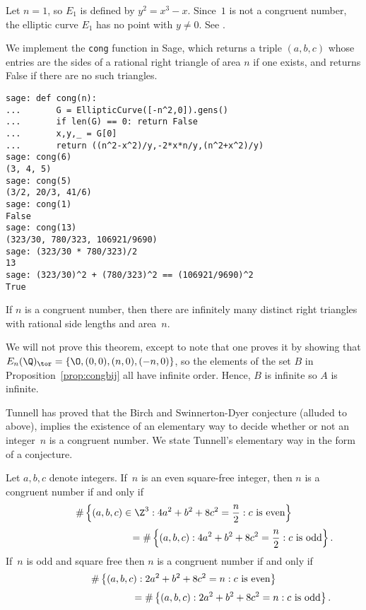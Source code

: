 \begin{example}
Let $n=1$, so $E_1$ is defined by $y^2=x^3-x$.  Since~$1$ is not
a congruent number, the elliptic curve $E_1$ has no point
with $y\neq 0$.  See .
\end{example}

\begin{sg}
  We implement the {\tt cong} function in Sage, which returns a triple
  $(a,b,c)$ whose entries are the sides of a rational right triangle
  of area $n$ if one exists, and returns False if there are no such
  triangles.
\begin{verbatim}
sage: def cong(n):
...       G = EllipticCurve([-n^2,0]).gens()
...       if len(G) == 0: return False
...       x,y,_ = G[0]
...       return ((n^2-x^2)/y,-2*x*n/y,(n^2+x^2)/y)
sage: cong(6)
(3, 4, 5)
sage: cong(5)
(3/2, 20/3, 41/6)
sage: cong(1)
False
sage: cong(13)
(323/30, 780/323, 106921/9690)
sage: (323/30 * 780/323)/2
13
sage: (323/30)^2 + (780/323)^2 == (106921/9690)^2
True
\end{verbatim}
\end{sg}


\begin{theorem}\label{thm:inftri}
If $n$ is a congruent number, then there are infinitely
many distinct right triangles with rational side lengths
and area~$n$.
\end{theorem}
We will not prove this theorem, except to note that one proves it by showing that
$E_n(\Q)_{\tor} = \{\O,(0,0),(n,0),(-n,0)\}$, so the
elements of the set $B$ in Proposition~\ref{prop:congbij} all have
infinite order. Hence, $B$ is infinite
so $A$ is infinite.


Tunnell has proved that the Birch and Swinnerton-Dyer conjecture
(alluded to above), implies the existence of an elementary way to
decide whether or not an integer~$n$ is a congruent number.  We state
Tunnell's elementary way in the form of a conjecture.
\begin{conjecture}\label{conj:cong}
Let $a,b,c$ denote integers.
If~$n$ is an even square-free integer, then
$n$ is a congruent number if and only if
$$
\#\left\{(a,b,c)\in\Z^3 : 4a^2 + b^2 + 8c^2 = \frac{n}{2} : c\text{\rm{} is even}\right\}$$
$$
  \qquad\qquad\qquad\qquad\qquad   =
  \#\left\{(a,b,c) : 4a^2 + b^2 + 8c^2 = \frac{n}{2}: c\text{\rm{} is odd}\right\}.$$
If~$n$ is odd and square free then
$n$ is a congruent number if and only if
$$\#\left\{(a,b,c) : 2a^2 + b^2 + 8c^2 = n : c\text{\rm{} is even}\right\}$$
$$  \qquad\qquad\qquad\qquad\qquad =
    \#\left\{(a,b,c) : 2a^2 + b^2 + 8c^2 = n: c\text{\rm{} is odd}\right\}.$$
\end{conjecture}

